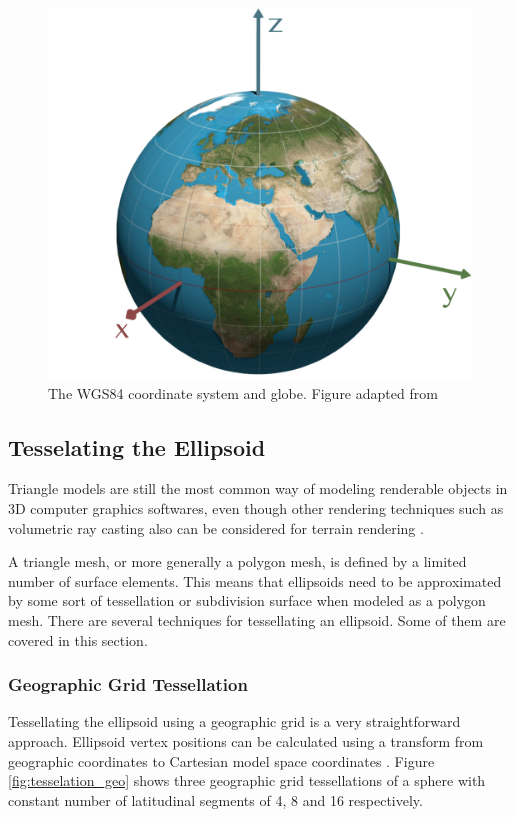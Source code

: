 \begin{figure}
\centering
\includegraphics[scale=0.25]{figures/wgs84.pdf}
\caption{The WGS84 coordinate system and globe. Figure adapted from \cite{mapprojections}}
\label{fig:wgs84}
\end{figure}

\subsection{Tesselating the Ellipsoid}

Triangle models are still the most common way of modeling renderable objects in 3D computer graphics softwares, even though other rendering techniques such as volumetric ray casting also can be considered for terrain rendering \cite[p. 149]{cozzi11}.

A triangle mesh, or more generally a polygon mesh, is defined by a limited number of surface elements. This means that ellipsoids need to be approximated by some sort of tessellation or subdivision surface when modeled as a polygon mesh. There are several techniques for tessellating an ellipsoid. Some of them are covered in this section.

\subsubsection{Geographic Grid Tessellation}
\label{sec:geogrid}
Tessellating the ellipsoid using a geographic grid is a very straightforward approach. Ellipsoid vertex positions can be calculated using a transform from geographic coordinates to Cartesian model space coordinates \cite[p. 25]{cozzi11}. Figure \ref{fig:tesselation_geo} shows three geographic grid tessellations of a sphere with constant number of latitudinal segments of 4, 8 and 16 respectively.

